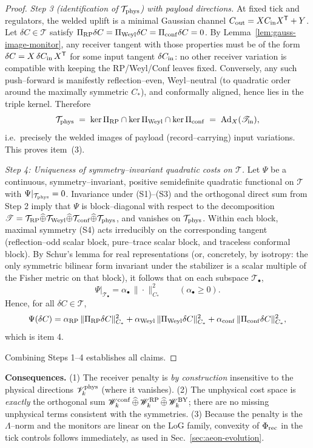 \documentclass[10pt]{article}
\theoremstyle{definition}
\theoremstyle{plain}
\begin{document}
\begin{proof}
\emph{Step 3 (identification of $\mathcal T_{\rm phys}$) with payload directions.}
At fixed tick and regulators, the welded uplift is a minimal Gaussian channel
$C_{\rm out}=X C_{\rm in}X^{\sf T}+Y$. Let $\delta C\in\mathscr T$ satisfy
$\Pi_{\rm RP}\delta C=\Pi_{\rm Weyl}\delta C=\Pi_{\rm conf}\delta C=0$. By
Lemma~\ref{lem:gauss-image-monitor}, any receiver tangent with those properties must be
of the form $\delta C=X\,\delta C_{\rm in}\,X^{\sf T}$ for some input tangent
$\delta C_{\rm in}$: no other receiver variation is compatible with keeping the
RP/Weyl/Conf leaves fixed. Conversely, any such push–forward is manifestly
reflection–even, Weyl–neutral (to quadratic order around the maximally symmetric
$C_\ast$), and conformally aligned, hence lies in the triple kernel. Therefore
\[
\mathcal T_{\rm phys}\;=\;\ker\Pi_{\rm RP}\cap\ker\Pi_{\rm Weyl}\cap\ker\Pi_{\rm conf}
\;=\;\mathrm{Ad}_X(\mathscr T_{\rm in}),
\]
i.e.\ precisely the welded images of payload (record–carrying) input variations.
This proves item~(3).


\emph{Step 4: Uniqueness of symmetry–invariant quadratic costs on $\mathscr T$.}
Let $\Psi$ be a continuous, symmetry–invariant, positive semidefinite quadratic functional on $\mathscr T$ with $\Psi|_{\mathcal T_{\rm phys}}=0$. Invariance under (S1)–(S3) and the orthogonal direct sum from Step 2 imply that $\Psi$ is block–diagonal with respect to the decomposition
$\mathscr T=\mathcal T_{\rm RP}\widehat\oplus\mathcal T_{\rm Weyl}\widehat\oplus\mathcal T_{\rm conf}\widehat\oplus\mathcal T_{\rm phys}$, and vanishes on $\mathcal T_{\rm phys}$. 
Within each block, maximal symmetry (S4) acts irreducibly on the corresponding tangent (reflection–odd scalar block, pure–trace scalar block, and traceless conformal block). By Schur’s lemma for real representations (or, concretely, by isotropy: the only symmetric bilinear form invariant under the stabilizer is a scalar multiple of the Fisher metric on that block), it follows that on each subspace $\mathcal T_\bullet$,
\[
\Psi|_{\mathcal T_\bullet}=\alpha_\bullet\,\|\cdot\|_{C_\ast}^2\qquad(\alpha_\bullet\ge 0).
\]
Hence, for all $\delta C\in\mathscr T$,
\[
\Psi(\delta C)
=\alpha_{\rm RP}\,\|\Pi_{\rm RP}\delta C\|_{C_\ast}^2
+\alpha_{\rm Weyl}\,\|\Pi_{\rm Weyl}\delta C\|_{C_\ast}^2
+\alpha_{\rm conf}\,\|\Pi_{\rm conf}\delta C\|_{C_\ast}^2,
\]
which is item 4.

Combining Steps 1–4 establishes all claims.
\end{proof}


\medskip
\noindent
\textbf{Consequences.} (1) The receiver penalty is \emph{by construction}
insensitive to the physical directions $\mathscr V_k^{\rm phys}$ (where it
vanishes). (2) The unphysical cost space is \emph{exactly} the orthogonal sum
$\mathscr W_k^{\rm conf}\,\widehat\oplus\,\mathscr W_k^{\rm RP}\,\widehat\oplus\,
\mathscr W_k^{\rm BY}$; there are no missing unphysical terms consistent with
the symmetries. (3) Because the penalty is the $\Lambda$–norm and the monitors
are linear on the LoG family, convexity of $\Phi_{\rm rec}$ in the tick controls
follows immediately, as used in Sec.~\ref{sec:aeon-evolution}.
\end{document}
